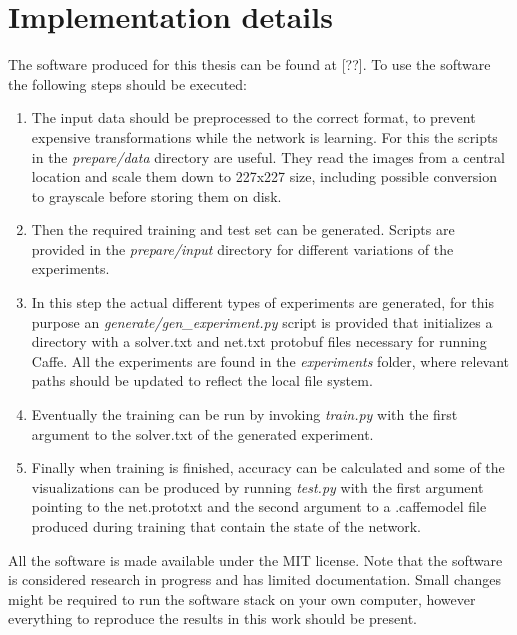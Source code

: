%
\chapter{Implementation details}
\label{app:implementation_details}

The software produced for this thesis can be found at [??]. To use the software the following steps should be executed:
\begin{enumerate}
\item The input data should be preprocessed to the correct format, to prevent expensive transformations while the network is learning. For this the scripts in the \textit{prepare/data} directory are useful. They read the images from a central location and scale them down to 227x227 size, including possible conversion to grayscale before storing them on disk.
\item Then the required training and test set can be generated. Scripts are provided in the \textit{prepare/input} directory for different variations of the experiments.
\item In this step the actual different types of experiments are generated, for this purpose an \textit{generate/gen\_experiment.py} script is provided that initializes a directory with a solver.txt and net.txt protobuf files necessary for running Caffe. All the experiments are found in the \textit{experiments} folder, where relevant paths should be updated to reflect the local file system.
\item Eventually the training can be run by invoking \textit{train.py} with the first argument to the solver.txt of the generated experiment. 
\item Finally when training is finished, accuracy can be calculated and some of the visualizations can be produced by running \textit{test.py} with the first argument pointing to the net.prototxt and the second argument to a .caffemodel file produced during training that contain the state of the network.
\end{enumerate}
All the software is made available under the MIT license. Note that the software is considered research in progress and has limited documentation. Small changes might be required to run the software stack on your own computer, however everything to reproduce the results in this work should be present.

